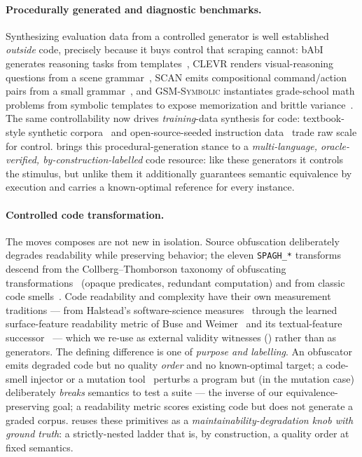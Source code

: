 \paragraph{Procedurally generated and diagnostic benchmarks.} Synthesizing evaluation data
from a controlled generator is well established \emph{outside} code, precisely because it
buys control that scraping cannot: bAbI generates reasoning tasks from
templates~\citep{weston2015babi}, CLEVR renders visual-reasoning questions from a scene
grammar~\citep{johnson2017clevr}, SCAN emits compositional command/action pairs from a
small grammar~\citep{lake2018scan}, and \textsc{GSM-Symbolic} instantiates grade-school
math problems from symbolic templates to expose memorization and brittle
variance~\citep{mirzadeh2024gsm}. The same controllability now drives \emph{training}-data
synthesis for code: textbook-style synthetic corpora~\citep{gunasekar2023textbooks} and
open-source-seeded instruction data~\citep{wei2024magicoder} trade raw scale for control.
\tool{} brings this procedural-generation stance to a \emph{multi-language,
oracle-verified, by-construction-labelled} code resource: like these generators it
controls the stimulus, but unlike them it additionally guarantees semantic equivalence by
execution and carries a known-optimal reference for every instance.

\paragraph{Controlled code transformation.} The moves \tool{} composes are not new in
isolation. Source obfuscation deliberately degrades readability while preserving
behavior; the eleven \texttt{SPAGH\_*} transforms descend from the Collberg--Thomborson
taxonomy of obfuscating transformations~\citep{collberg1997taxonomy} (opaque predicates,
redundant computation) and from classic code smells~\citep{fowler-refactoring}. Code
readability and complexity have their own measurement traditions --- from Halstead's
software-science measures~\citep{halstead1977elements} through the learned surface-feature
readability metric of Buse and Weimer~\citep{buse2010readability} and its textual-feature
successor~\citep{scalabrino2018comprehensive} --- which we re-use as external validity
witnesses () rather than as generators. The defining difference is one of
\emph{purpose and labelling}. An obfuscator emits degraded code but no quality
\emph{order} and no known-optimal target; a code-smell injector or a mutation
tool~\citep{demillo1978hints,jia2011analysis} perturbs a program but (in the mutation case)
deliberately \emph{breaks} semantics to test a suite --- the inverse of our
equivalence-preserving goal; a readability metric scores existing code but does not generate a
graded corpus. \tool{} reuses these primitives as a \emph{maintainability-degradation
knob with ground truth}: a strictly-nested ladder that is, by construction, a quality
order at fixed semantics.

